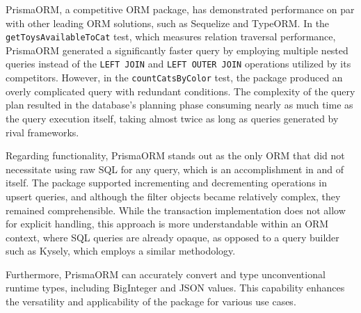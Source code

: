 PrismaORM, a competitive ORM package, has demonstrated performance on par with
other leading ORM solutions, such as Sequelize and TypeORM. In the
\texttt{getToysAvailableToCat} test, which measures relation traversal
performance, PrismaORM generated a significantly faster query by employing
multiple nested queries instead of the \texttt{LEFT JOIN} and \texttt{LEFT OUTER
JOIN} operations utilized by its competitors. However, in the
\texttt{countCatsByColor} test, the package produced an overly complicated query
with redundant conditions. The complexity of the query plan resulted in the
database's planning phase consuming nearly as much time as the query execution
itself, taking almost twice as long as queries generated by rival frameworks.

Regarding functionality, PrismaORM stands out as the only ORM that did not
necessitate using raw SQL for any query, which is an accomplishment in and of
itself. The package supported incrementing and decrementing operations in upsert
queries, and although the filter objects became relatively complex, they
remained comprehensible. While the transaction implementation does not allow for
explicit handling, this approach is more understandable within an ORM context,
where SQL queries are already opaque, as opposed to a query builder such as
Kysely, which employs a similar methodology.

Furthermore, PrismaORM can accurately convert and type unconventional runtime
types, including BigInteger and JSON values. This capability enhances the
versatility and applicability of the package for various use cases.
